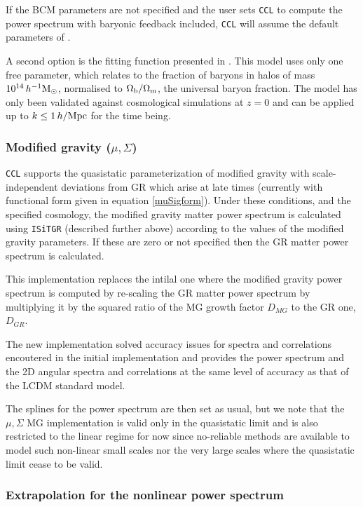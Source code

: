 \documentclass[\docopts]{\docclass}
\newcommand{\ccl}{{\tt CCL}\xspace}
\begin{document}
If the BCM parameters are not specified and the user sets \ccl to compute the power
spectrum with baryonic feedback included, \ccl will assume the default parameters
of \citet{Schneider15}.

A second option is the fitting function presented in \citet{vanDaalen19}. This model
uses only one free parameter, which relates to the fraction of baryons in halos of mass
$10^{14}\,h^{-1}\rm M_\odot$, normalised to $\Omega_{\rm b}/\Omega_{\rm m}$, the universal
baryon fraction. The model has only been validated against cosmological simulations at $z=0$
and can be applied up to $k\leq 1\,h/\rm Mpc$ for the time being.

\subsubsection{Modified gravity ($\mu, \Sigma$)}

\ccl supports the quasistatic parameterization of modified gravity with
scale-independent deviations from GR which arise at late times (currently with
functional form given in equation \ref{muSigform}). Under these conditions,
and the specified cosmology, the modified gravity matter power spectrum is
calculated using {\tt ISiTGR}  (described further above) according to the values of the modified
gravity parameters. If these are zero or not specified then the GR matter power
spectrum is calculated.

This implementation replaces the intilal one where the modified gravity power
spectrum is computed by re-scaling the GR matter power spectrum by
multiplying it by the squared ratio of the MG  growth factor $D_{MG}$ to the GR
one, $D_{GR}$.

The new implementation solved accuracy issues for spectra and  correlations
encoutered in the initial implementation and provides the power  spectrum and
the 2D angular spectra and correlations at the same level of accuracy
as that of the LCDM standard model.

The splines for the power spectrum are then set as usual, but we note that
the $\mu, \Sigma$ MG implementation is valid only in the quasistatic limit
and is also restricted to the linear regime for now since no-reliable methods
are available to model such non-linear small scales nor the very
large scales where the quasistatic limit cease to be valid.

\subsubsection{Extrapolation for the nonlinear power spectrum}
\label{sec:NLextrapol}
\end{document}
